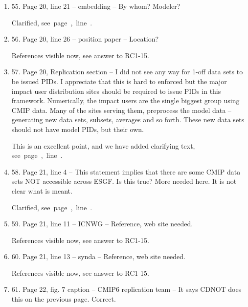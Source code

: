 \documentclass[gmd,manuscript]{copernicus}
\newcommand{\plref}[1]{\mbox{see page \pageref{p-#1}, line
    \lineref{l-#1}.}}
\newenvironment{answer}{\color{blue}}{}
\begin{document}
\begin{enumerate}[label=RC1-\arabic*,leftmargin=*]
  \begin{answer}
    Clarified, \plref{RC1-54}
  \end{answer}
\item 55. Page 20, line 21 -- embedding -- By whom? Modeler?

  \begin{answer}
    Clarified, \plref{RC1-55}
  \end{answer}
\item 56. Page 20, line 26 -- position paper -- Location?

  \begin{answer}
    References visible now, see answer to RC1-15.
  \end{answer}
\item 57. Page 20, Replication section -- I did not see any way for
  1-off data sets to be issued PIDs. I appreciate that this is hard to
  enforced but the major impact user distribution sites should be
  required to issue PIDs in this framework. Numerically, the impact
  users are the single biggest group using CMIP data. Many of the
  sites serving them, preprocess the model data -- generating new data
  sets, subsets, averages and so forth. These new data sets should not
  have model PIDs, but their own.

  \begin{answer}
    This is an excellent point, and we have added clarifying text,
    \plref{RC1-57}
  \end{answer}
\item 58. Page 21, line 4 -- This statement implies that there are some
  CMIP data sets NOT accessible across ESGF. Is this true? More needed
  here. It is not clear what is meant.

  \begin{answer}
    Clarified, \plref{RC1-58}
  \end{answer}
\item 59. Page 21, line 11 -- ICNWG -- Reference, web site needed.

  \begin{answer}
    References visible now, see answer to RC1-15.
  \end{answer}
\item 60. Page 21, line 13 -- synda -- Reference, web site needed.

  \begin{answer}
    References visible now, see answer to RC1-15.
  \end{answer}
\item 61. Page 22, fig. 7 caption -- CMIP6 replication team -- It says
  CDNOT does this on the previous page. Correct.


\end{enumerate}
\end{document}
